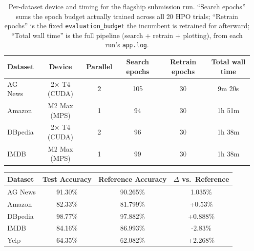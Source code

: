 \documentclass[10pt]{article}
\begin{document}
\begin{table}[H]
\centering
\begin{tabular}{@{}lccccc@{}}
\toprule
\textbf{Dataset} & \textbf{Device} & \textbf{Parallel} & \textbf{Search epochs} & \textbf{Retrain epochs} & \textbf{Total wall time} \\
\midrule
AG News  & 2$\times$ T4 (CUDA)  & 2 & 105 & 30 & 9m 20s \\
Amazon   & M2 Max (MPS)         & 1 & 94  & 30 & 1h 51m \\
DBpedia  & 2$\times$ T4 (CUDA)  & 2 & 96  & 30 & 1h 38m \\
IMDB     & M2 Max (MPS)         & 1 & 99  & 30 & 1h 38m \\
\bottomrule
\end{tabular}
\caption{Per-dataset device and timing for the flagship submission run. ``Search epochs'' sums
the epoch budget actually trained across all 20 HPO trials; ``Retrain epochs'' is the fixed
\texttt{evaluation\_budget} the incumbent is retrained for afterward; ``Total wall time'' is the
full pipeline (search + retrain + plotting), from each run's \texttt{app.log}.}
\end{table}


\begin{center}
\begin{tabular}{lccc}
\hline
Dataset & Test Accuracy & Reference Accuracy & $\Delta$ vs.\ Reference \\
\hline
AG News & 91.30\% & 90.265\% & 1.035\% \\
Amazon & 82.33\% & 81.799\% & +0.53\% \\
DBpedia & 98.77\% & 97.882\% & +0.888\% \\
IMDB & 84.16\% & 86.993\% & -2.83\% \\
Yelp & 64.35\% & 62.082\% & +2.268\% \\
\hline
\end{tabular}
\end{center}
\end{document}
